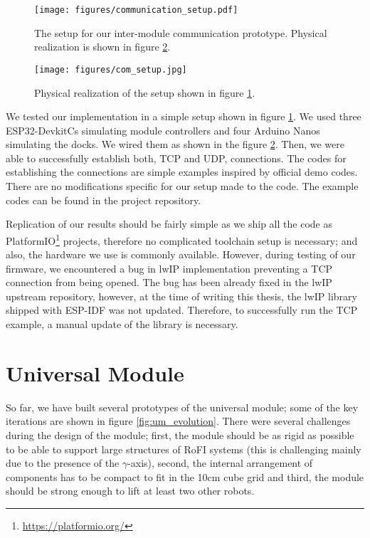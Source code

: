 \begin{figure}[!t]
    \centering
    \texttt{[image: figures/communication\_setup.pdf]}
    \caption{The setup for our inter-module communication prototype. Physical
    realization is shown in figure \ref{fig:comm_setup_p}.}
    \label{fig:comm_setup}
\end{figure}

\begin{figure}[!t]
    \centering
    \texttt{[image: figures/com\_setup.jpg]}
    \caption{Physical realization of the setup shown in figure \ref{fig:comm_setup}.}
    \label{fig:comm_setup_p}
\end{figure}

We tested our implementation in a simple setup shown in figure
\ref{fig:comm_setup}. We used three ESP32-DevkitCs simulating module controllers
and four Arduino Nanos simulating the docks. We wired them as shown in the
figure \ref{fig:comm_setup_p}. Then, we were able to successfully establish
both, TCP and UDP, connections. The codes for establishing the connections are
simple examples inspired by official demo codes. There are no modifications
specific for our setup made to the code. The example codes can be found in the
project repository.

Replication of our results should be fairly simple as we ship all the code as
PlatformIO\footnote{\url{https://platformio.org/}} projects, therefore no
complicated toolchain setup is necessary; and also, the hardware we use is
commonly available. However, during testing of our firmware, we encountered a
bug in lwIP implementation preventing a TCP connection from being opened. The
bug has been already fixed in the lwIP upstream repository, however, at the time
of writing this thesis, the lwIP library shipped with ESP-IDF was not updated.
Therefore, to successfully run the TCP example, a manual update of the library
is necessary.

\section{Universal Module}

So far, we have built several prototypes of the universal module; some of the
key iterations are shown in figure \ref{fig:um_evolution}. There were several
challenges during the design of the module; first, the module should be as rigid
as possible to be able to support large structures of RoFI systems (this is
challenging mainly due to the presence of the $\gamma$-axis), second, the
internal arrangement of components has to be compact to fit in the 10cm cube
grid and third, the module should be strong enough to lift at least two other
robots.

